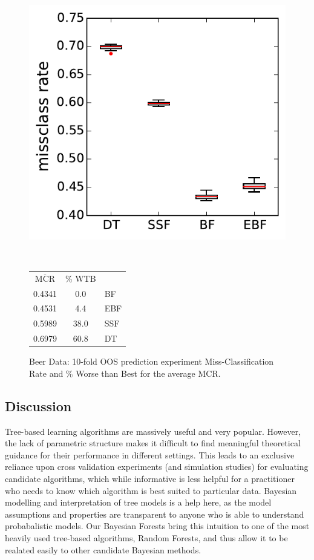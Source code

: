 \documentclass{article}
\begin{document}
\begin{figure}
\begin{minipage}{0.5\linewidth}
\includegraphics[width=\textwidth]{../graphs/beer}
\end{minipage}
~~
\begin{minipage}{0.4\linewidth}
{\footnotesize
\begin{tabular}{c c | l}
$\overline{\text{MCR}}$  & \% WTB & \\
\cline{1-2}\rule{0pt}{3ex} 
0.4341 &  0.0 & BF \\
0.4531 &  4.4 & EBF \\
0.5989 & 38.0 & SSF \\
0.6979 & 60.8 & DT \\
\end{tabular}}
\end{minipage}
\caption{Beer Data: 10-fold OOS prediction experiment Miss-Classification Rate and \% Worse than Best for the average MCR. }
\end{figure}

\subsection{Discussion}\label{discussion}

Tree-based learning algorithms are massively useful and very popular.
However, the lack of parametric structure makes it difficult to find
meaningful theoretical guidance for their performance in different
settings. This leads to an exclusive reliance upon cross validation
experiments (and simulation studies) for evaluating candidate
algorithms, which while informative is less helpful for a practitioner
who needs to know which algorithm is best suited to particular data.
Bayesian modelling and interpretation of tree models is a help here, as
the model assumptions and properties are transparent to anyone who is
able to understand probabalistic models. Our Bayesian Forests bring this
intuition to one of the most heavily used tree-based algorithms, Random
Forests, and thus allow it to be realated easily to other candidate
Bayesian methods.
\end{document}
